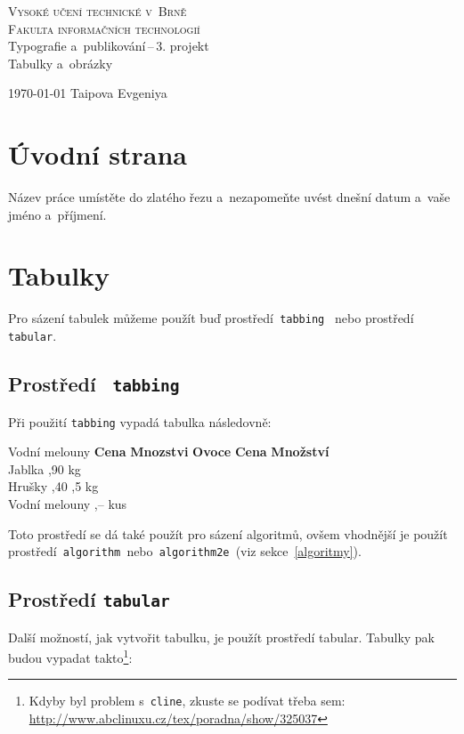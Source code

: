 \documentclass[a4paper,11pt]{article}
\begin{document}
\begin{titlepage}
\begin{center}
\Huge\textsc{Vysoké učení technické v~Brně} \\
\huge\textsc{Fakulta informačních technologií} \\
\LARGE Typografie a~publikování\,--\,3. projekt \\
\Huge Tabulky a~obrázky
\end{center}

{\Large \today
\hfill 
Taipova Evgeniya}
\end{titlepage}

\section{Úvodní strana}
Název práce umístěte do zlatého řezu a~nezapomeňte uvést dnešní datum a~vaše jméno a~příjmení.

\section{Tabulky}
Pro sázení tabulek můžeme použít buď prostředí\texttt{ tabbing } nebo prostředí \texttt{tabular}.

\subsection{Prostředí \texttt{ tabbing}}
Při použití \texttt{tabbing} vypadá tabulka následovně:

\begin{tabbing}
Vodní melouny \quad \= \textbf{Cena} \quad \= \textbf{Mnozstvi} \quad \kill
\textbf{Ovoce}      \> \textbf{Cena}       \> \textbf{Množství}\\
Jablka         ,90	 kg   \\
Hrušky         ,40	,5 kg \\
Vodní melouny  ,--  kus  \\
\end{tabbing}
Toto prostředí se dá také použít pro sázení algoritmů, ovšem vhodnější je použít prostředí\texttt{ algorithm }nebo\texttt{ algorithm2e }(viz sekce~\ref{algoritmy}).

\subsection{Prostředí \texttt{tabular}}
Další možností, jak vytvořit tabulku, je použít prostředí tabular. Tabulky pak budou vypadat takto\footnote{Kdyby byl problem s~\texttt{cline}, zkuste se podívat třeba sem: \url{http://www.abclinuxu.cz/tex/poradna/show/325037}}:
\end{document}
